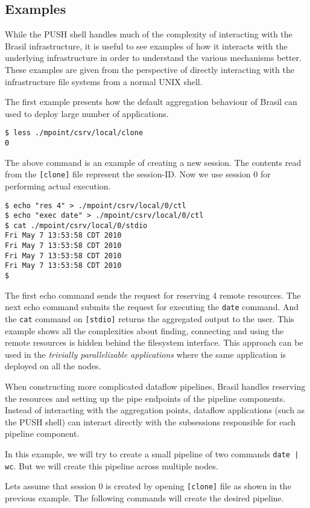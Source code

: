 \subsection{Examples}
While the PUSH shell handles much of the complexity of interacting with the
Brasil infrastructure, it is useful to see examples of how it interacts
with the underlying infrastructure in order to understand the various mechanisms
better.  These examples are given from the perspective of directly interacting
with the infrastructure file systems from a normal UNIX shell.

The first example presents how the default aggregation behaviour of Brasil can
used to deploy large number of applications.

\begin{verbatim}
$ less ./mpoint/csrv/local/clone
0 
\end{verbatim}
The above command is an example of creating a new session. The contents read
from the \texttt{[clone]} file represent the session-ID.  Now we use session 0
for performing actual execution.
\begin{verbatim}
$ echo "res 4" > ./mpoint/csrv/local/0/ctl
$ echo "exec date" > ./mpoint/csrv/local/0/ctl
$ cat ./mpoint/csrv/local/0/stdio
Fri May 7 13:53:58 CDT 2010
Fri May 7 13:53:58 CDT 2010
Fri May 7 13:53:58 CDT 2010
Fri May 7 13:53:58 CDT 2010
$
\end{verbatim}
The first echo command sends the request for reserving 4 remote resources. The
next echo command submits the request for executing the \texttt{date} command.
And the \texttt{cat} command on \texttt{[stdio]} returns the aggregated output
to the user.  This example shows all the complexities about finding, connecting
and using the remote resources is hidden behind the filesystem interface.
This approach can be used in the \textit{trivially parallelizable applications}
where the same application is deployed on all the nodes.

When constructing more complicated dataflow pipelines, Brasil handles
reserving the resources and setting up the pipe endpoints of the pipeline
components.
Instead of interacting with the aggregation points, dataflow applications (such
as the PUSH shell) can interact directly with the subsessions responsible for 
each pipeline component.

In this example, we will try to create a small pipeline of two commands
\texttt{date | wc}.  But we will create this pipeline across multiple nodes. 

Lets assume that session 0 is created by opening \texttt{[clone]} file as shown
in the previous example.  The following commands will create the desired
pipeline.

